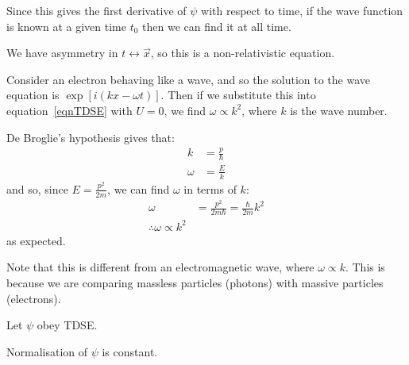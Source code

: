 \documentclass[../Main.tex]{subfiles}
\begin{document}
\begin{remarks}
    \item Since this gives the first derivative of $\psi$ with respect to time, if the wave function is known at a given time $t_0$ then we can find it at all time.
    \item We have asymmetry in $t \leftrightarrow \vec{x}$, so this is a non-relativistic equation.
\end{remarks}
\begin{example}
    Consider an electron behaving like a wave, and so the solution to the wave equation is $\exp\left[i(kx - \omega t)\right]$. Then if we substitute this into equation~\ref{eqnTDSE} with $U = 0$, we find $\omega \propto k^2$, where $k$ is the wave number.

    De Broglie's hypothesis gives that:
    \begin{align*}
        k &= \frac{p}{\hbar} \\
        \omega &= \frac{E}{k}
    \end{align*}
    and so, since $E = \frac{p^2}{2m}$, we can find $\omega$ in terms of $k$:
    \begin{align*}
        \omega &= \frac{p^2}{2m \hbar} = \frac{\hbar}{2m} k^2 \\
        \therefore \omega \propto k^2
    \end{align*}
    as expected.

    Note that this is different from an electromagnetic wave, where $\omega \propto k$. This is because we are comparing massless particles (photons) with massive particles (electrons).
\end{example}
\begin{propositions}{
        Let $\psi$ obey TDSE.
        \label{propsTDSE}
    }
    \item Normalisation of $\psi$ is constant.
\end{propositions}
\end{document}
